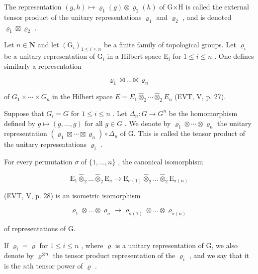 The representation \((g,h)\mapsto\varrho_{1}(g)\otimes\varrho_{2}(h)\) of G×H is called the external tensor product of the unitary representations \(\varrho_{1}\) and \(\varrho_{2}\) , and is denoted \(\varrho_{1}\boxtimes\varrho_{2}\) .

Let \(n \in \mathbf{N}\) and let \((\mathrm{G}_i)_{1 \leqslant i \leqslant n}\) be a finite family of topological groups. Let \(\varrho_i\) be a unitary representation of \(\mathrm{G}_i\) in a Hilbert space \(\mathrm{E}_i\) for \(1 \leqslant i \leqslant n\) . One defines similarly a representation

\[
\varrho_ {1} \boxtimes \dots \boxtimes \varrho_ {n}
\]

of \(G_{1} \times \cdots \times G_{n}\) in the Hilbert space \(E = E_{1} \widehat{\otimes}_{2} \cdots \widehat{\otimes}_{2} E_{n}\) (EVT, V, p. 27).

Suppose that \(G_{i} = G\) for \(1 \leqslant i \leqslant n\) . Let \(\Delta_{n}: G \to G^{n}\) be the homomorphism defined by \(g \mapsto (g, \ldots, g)\) for all \(g \in G\) . We denote by \(\varrho_{1} \otimes \cdots \otimes \varrho_{n}\) the unitary representation \((\varrho_{1} \boxtimes \cdots \boxtimes \varrho_{n}) \circ \Delta_{n}\) of G. This is called the tensor product of the unitary representations \(\varrho_{i}\) .

For every permutation \(\sigma\) of \(\{1,\ldots,n\}\) , the canonical isomorphism

\[
\mathrm{E} _ {1} \widehat {\otimes} _ {2} \dots \widehat {\otimes} _ {2} \mathrm{E} _ {n} \rightarrow \mathrm{E} _ {\sigma (1)} \widehat {\otimes} _ {2} \dots \widehat {\otimes} _ {2} \mathrm{E} _ {\sigma (n)}
\]

(EVT, V, p. 28) is an isometric isomorphism

\[
\varrho_ {1} \otimes \dots \otimes \varrho_ {n} \rightarrow \varrho_ {\sigma (1)} \otimes \dots \otimes \varrho_ {\sigma (n)}
\]

of representations of G.

If \(\varrho_{i}=\varrho\) for \(1\leqslant i\leqslant n\) , where \(\varrho\) is a unitary representation of G, we also denote by \(\varrho^{\otimes n}\) the tensor product representation of the \(\varrho_{i}\) , and we say that it is the \(n\)th tensor power of \(\varrho\) .

